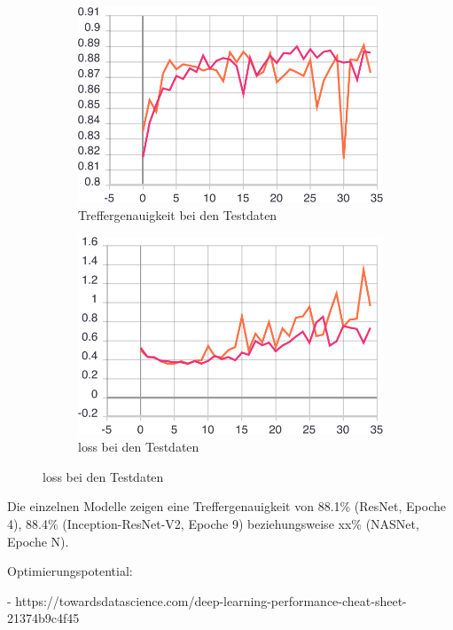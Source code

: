 \begin{figure}[ht]
\begin{subfigure}[b]{0.5\linewidth}
    \centering
    \includegraphics[width=0.75\linewidth]{graphics/image-classification-results/val_acc.pdf} 
    \caption{Treffergenauigkeit bei den Testdaten} 
    \label{image-class-results:c} 
  \end{subfigure}%
  \begin{subfigure}[b]{0.5\linewidth}
    \centering
    \includegraphics[width=0.75\linewidth]{graphics/image-classification-results/val_loss.pdf} 
    \caption{loss bei den Testdaten} 
    \label{image-class-results:d} 
  \end{subfigure}
  \centering
\end{figure}


Die einzelnen Modelle zeigen eine Treffergenauigkeit von 88.1\% (ResNet, Epoche 4), 88.4\% (Inception-ResNet-V2, Epoche 9) beziehungsweise xx\% (NASNet, Epoche N).



Optimierungspotential:

- https://towardsdatascience.com/deep-learning-performance-cheat-sheet-21374b9c4f45

